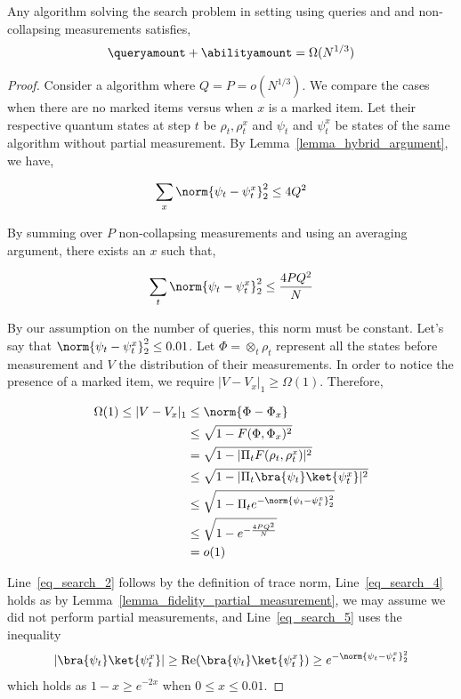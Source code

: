 \begin{lemma}\label{lemma_lowerbound_search}
    Any algorithm solving the search problem in \pdqpname setting using \queryamount queries and and \abilityamount non-collapsing measurements satisfies,
    \begin{align*}
        \queryamount+\abilityamount = \Omega(N^{1/3})
    \end{align*}
\end{lemma}
\begin{proof}

Consider a \pdqpname algorithm where $Q=P = o(N^{1/3})$. We compare the cases when there are no marked items versus when $x$ is a marked item. Let their respective quantum states at step $t$ be $\rho_t, \rho_t^x$ and $\psi_t$ and $\psi_t^x$ be states of the same algorithm without partial measurement. By Lemma~\ref{lemma_hybrid_argument}, we have,

\begin{align*}
    \sum_x \norm{\psi_t-\psi_t^x}^2_2 \leq 4Q^2
\end{align*}

By summing over $P$ non-collapsing measurements and using an averaging argument, there exists an $x$ such that,

\begin{align*}
\sum_t \norm{\psi_t - \psi_t^x}^2_2 \leq \frac{4PQ^2}{N}
\end{align*}

By our assumption on the number of queries, this norm must be constant. Let's say that $\norm{\psi_t-\psi_t^x}_2^2 \leq 0.01$. Let $\Phi=\otimes_t \rho_t$ represent all the states before measurement and $V$ the distribution of their measurements. In order to notice the presence of a marked item, we require $|V-V_x|_1\geq \Omega(1)$. Therefore,

\begin{align}
    \Omega(1)\leq |V-V_x|_1 &\leq \norm{\Phi - \Phi_x} \label{eq_search_1}\\
    &\leq \sqrt{1-F(\Phi, \Phi_x)^2}\label{eq_search_2}\\
    & =\sqrt{1-|\Pi_t F(\rho_t, \rho_t^x)|^2}\label{eq_search_3}\\
    &\leq \sqrt{1-|\Pi_t \bra{\psi_t}\ket{ \psi_t^x}|^2}\label{eq_search_4}\\
    &\leq \sqrt{1-\Pi_t e^{-\norm{\psi_t-\psi_t^x}^2_2}}\label{eq_search_5}\\
    &\leq \sqrt{1 - e^{-\frac{4PQ^2}{N}}}\label{eq_search_6}\\
    &=o(1)
\end{align}

Line~\ref{eq_search_2} follows by the definition of trace norm, Line~\ref{eq_search_4} holds as by Lemma~\ref{lemma_fidelity_partial_measurement}, we may assume we did not perform partial measurements, and Line~\ref{eq_search_5} uses the inequality 
\begin{align*}
    |\bra{\psi_t}\ket{\psi_t^x}|\geq \text{Re}(\bra{\psi_t}\ket{\psi_t^x})\geq e^{-\norm{\psi_t-\psi_t^x}^2_2}
\end{align*}
which holds as $1-x\geq e^{-2x}$ when $0\leq x\leq 0.01$.
\end{proof}

